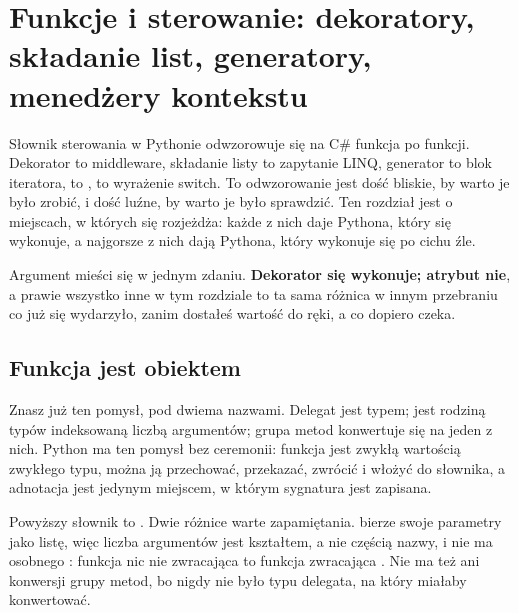 
\chapter{Funkcje i sterowanie: dekoratory, składanie list, generatory, menedżery kontekstu}
\label{ch:functions}

\noindent
Słownik sterowania w Pythonie odwzorowuje się na C\# funkcja po funkcji.
Dekorator to middleware, składanie listy to zapytanie LINQ, generator to
blok iteratora,  to ,  to wyrażenie
switch. To odwzorowanie jest dość bliskie, by warto je było zrobić, i dość
luźne, by warto je było sprawdzić. Ten rozdział jest o miejscach, w których
się rozjeżdża: każde z nich daje Pythona, który się wykonuje, a najgorsze
z nich dają Pythona, który wykonuje się po cichu źle.

Argument mieści się w jednym zdaniu. \textbf{Dekorator się wykonuje;
atrybut nie}, a prawie wszystko inne w tym rozdziale to ta sama różnica w
innym przebraniu \dash{} co już się wydarzyło, zanim dostałeś wartość do
ręki, a co dopiero czeka.

\section{Funkcja jest obiektem}
\label{sec:ch05-first-class}

Znasz już ten pomysł, pod dwiema nazwami. Delegat jest typem;
 jest rodziną typów indeksowaną liczbą argumentów; grupa metod
konwertuje się na jeden z nich. Python ma ten pomysł bez ceremonii: funkcja
jest zwykłą wartością zwykłego typu, można ją przechować, przekazać, zwrócić
i włożyć do słownika, a adnotacja jest jedynym miejscem, w którym sygnatura
jest zapisana.


\begin{csbox}
Powyższy słownik to . Dwie różnice
warte zapamiętania.  bierze swoje parametry jako listę, więc
liczba argumentów jest kształtem, a nie częścią nazwy, i nie ma osobnego
: funkcja nic nie zwracająca to funkcja zwracająca .
Nie ma też  ani konwersji grupy metod, bo nigdy nie było typu
delegata, na który miałaby konwertować.
\end{csbox}

